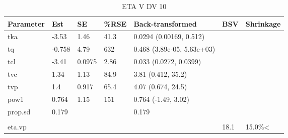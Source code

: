 \begin{table}
\centering\centering
\caption{ETA V DV 10}
\centering
\fontsize{8}{10}\selectfont
\begin{tabular}[t]{lllllll}
\toprule
\textbf{Parameter} & \textbf{Est} & \textbf{SE} & \textbf{\%RSE} & \textbf{Back-transformed} & \textbf{BSV} & \textbf{Shrinkage}\\
\midrule
tka & -3.53 & 1.46 & 41.3 & 0.0294 (0.00169, 0.512) &  & \\
\midrule
tq & -0.758 & 4.79 & 632 & 0.468 (3.89e-05, 5.63e+03) &  & \\
\midrule
tcl & -3.41 & 0.0975 & 2.86 & 0.033 (0.0272, 0.0399) &  & \\
\midrule
tvc & 1.34 & 1.13 & 84.9 & 3.81 (0.412, 35.2) &  & \\
\midrule
tvp & 1.4 & 0.917 & 65.4 & 4.07 (0.674, 24.5) &  & \\
\midrule
pow1 & 0.764 & 1.15 & 151 & 0.764 (-1.49, 3.02) &  & \\
\midrule
prop.sd & 0.179 &  &  & 0.179 &  & \\
\midrule\\
eta.vp &  &  &  &  & 18.1 & 15.0\%<\\
\bottomrule
\end{tabular}
\end{table}